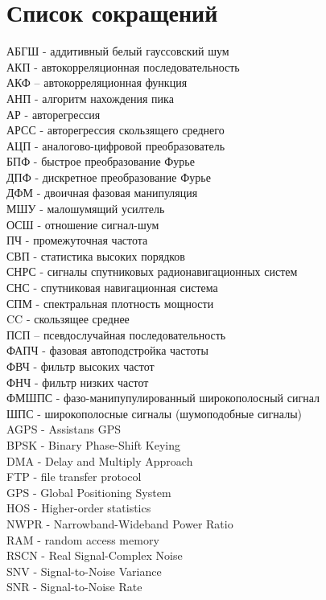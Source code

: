 \chapter*{Список сокращений}
\noindent
АБГШ - аддитивный белый гауссовский шум				\\
АКП - автокорреляционная последовательность			\\
АКФ – автокорреляционная функция				\\
АНП - алгоритм нахождения пика					\\
АР - авторегрессия						\\
АРСС - авторегрессия скользящего среднего			\\
АЦП - аналогово-цифровой преобразователь			\\
БПФ - быстрое преобразование Фурье				\\
ДПФ - дискретное преобразование Фурье				\\
ДФМ - двоичная фазовая манипуляция				\\
МШУ - малошумящий усилтель					\\
ОСШ - отношение сигнал-шум 					\\
ПЧ - промежуточная частота					\\
СВП - статистика высоких порядков				\\
СНРС - сигналы спутниковых радионавигационных систем		\\
СНС - спутниковая навигационная система				\\
СПМ - спектральная плотность мощности				\\
CC - скользящее среднее						\\
ПСП – псевдослучайная последовательность			\\
ФАПЧ - фазовая автоподстройка частоты				\\
ФВЧ - фильтр высоких частот					\\
ФНЧ - фильтр низких частот					\\
ФМШПС - фазо-манипупулированный широкополосный сигнал		\\
ШПС -  широкополосные сигналы (шумоподобные сигналы)		\\

\noindent
AGPS - Assistans GPS						\\
BPSK - Binary Phase-Shift Keying				\\
DMA - Delay and Multiply Approach				\\
FTP - file transfer protocol					\\
GPS - Global Positioning System					\\
HOS - Higher-order statistics					\\
NWPR - Narrowband-Wideband Power Ratio				\\
RAM - random access memory					\\
RSCN - Real Signal-Complex Noise				\\
SNV - Signal-to-Noise Variance					\\
SNR - Signal-to-Noise Rate					\\

\newpage
